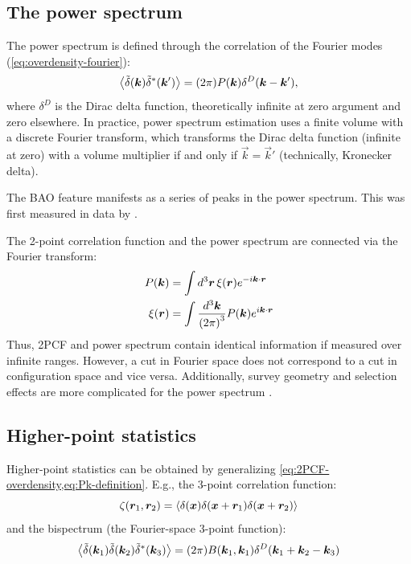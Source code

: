 \subsection{The power spectrum}

The power spectrum is defined through the correlation of the Fourier modes (\eqref{eq:overdensity-fourier}):
\begin{equation}
    \ev{\tilde \delta \qty(\vec k) \tilde \delta^* \qty(\vec k')} = \qty(2\pi) P(\vec k) \delta^D \qty(\vec k - \vec k'), \label{eq:Pk-definition}
\end{equation}
where $\delta^D$ is the Dirac delta function, theoretically infinite at zero argument and zero elsewhere.
In practice, power spectrum estimation uses a finite volume with a discrete Fourier transform, which transforms the Dirac delta function (infinite at zero) with a volume multiplier if and only if $\vec k = \vec k'$ (technically, Kronecker delta).

The BAO feature manifests as a series of peaks in the power spectrum.
This was first measured in data by \cite{BAO-discovery-Cole-et-al}.

The 2-point correlation function and the power spectrum are connected via the Fourier transform:
\begin{align}
    P \qty(\bm k) &= \int d^3 \bm r \, \xi \qty(\bm r) e^{-i \bm k \cdot \bm r} \\
    \xi \qty(\bm r) &= \int \frac{d^3 \bm k}{\qty(2\pi)^3} P \qty(\bm k) e^{i \bm k \cdot \bm r}
\end{align}
Thus, 2PCF and power spectrum contain identical information if measured over infinite ranges.
However, a cut in Fourier space does not correspond to a cut in configuration space and vice versa.
Additionally, survey geometry and selection effects are more complicated for the power spectrum \citep{pypower-methodology}.

\subsection{Higher-point statistics}

Higher-point statistics can be obtained by generalizing \cref{eq:2PCF-overdensity,eq:Pk-definition}.
E.g., the 3-point correlation function:
\begin{equation}
    \zeta \qty(\vec r_1, \vec r_2) = \ev{\delta \qty(\vec x) \delta \qty(\vec x + \vec r_1) \delta \qty(\vec x + \vec r_2)}
\end{equation}
and the bispectrum (the Fourier-space 3-point function):
\begin{equation}
    \ev{\tilde \delta \qty(\vec k_1) \tilde \delta \qty(\vec k_2) \tilde \delta^* \qty(\vec k_3)} = \qty(2\pi) B(\vec k_1, \vec k_1) \delta^D \qty(\vec k_1 + \vec k_2 - \vec k_3)
\end{equation}

